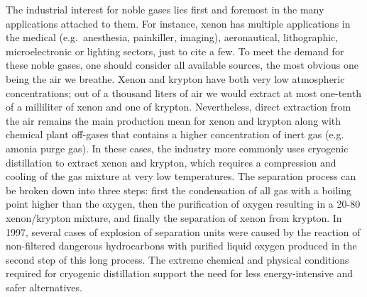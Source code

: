 \documentclass[main.tex]{subfiles}
\begin{document}
The industrial interest for noble gases lies first and foremost in the many applications attached to them. For instance, xenon has multiple applications in the medical (e.g.\ anesthesia, painkiller, imaging),\cite{cullen1951anesthetic, holstrater2011intranasal,Mammarappallil_2019} aeronautical\cite{Patterson_2002,Coxhill_2005}, lithographic\cite{Abramov_2018}, microelectronic\cite{Chang_1995} or lighting sectors,\cite{Jarman_1974,Tanaka_2019} just to cite a few. To meet the demand for these noble gases, one should consider all available sources, the most obvious one being the air we breathe. Xenon and krypton have both very low atmospheric concentrations; out of a thousand liters of air we would extract at most one-tenth of a milliliter of xenon and one of krypton.\cite{kerry2007industrial} Nevertheless, direct extraction from the air remains the main production mean for xenon and krypton along with chemical plant off-gases that contains a higher concentration of inert gas (e.g. amonia purge gas). In these cases, the industry more commonly uses cryogenic distillation to extract xenon and krypton, which requires a compression and cooling of the gas mixture at very low temperatures. The separation process can be broken down into three steps: first the condensation of all gas with a boiling point higher than the oxygen, then the purification of oxygen resulting in a 20-80 xenon/krypton mixture, and finally the separation of xenon from krypton. In 1997, several cases of explosion of separation units were caused by the reaction of non-filtered dangerous hydrocarbons with purified liquid oxygen produced in the second step of this long process.\cite{distill_accident,distill_accident2} The extreme chemical and physical conditions required for cryogenic distillation support the need for less energy-intensive and safer alternatives. 
\end{document}
